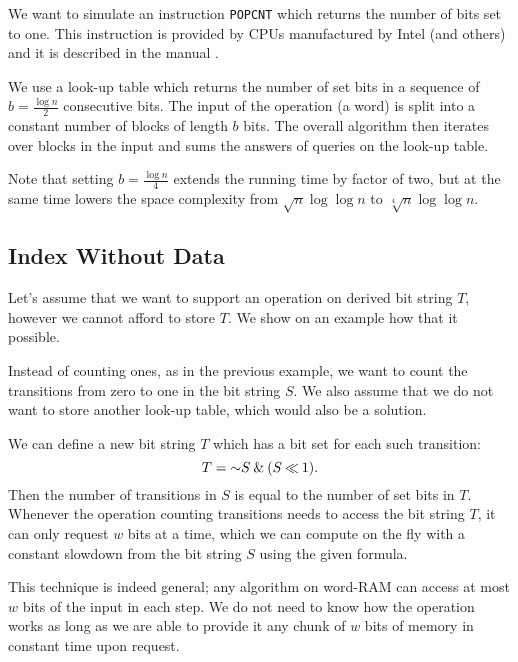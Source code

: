 \begin{example}\label{ex:precomputation}
	We want to simulate an instruction \texttt{POPCNT} which returns the number of bits set to one.
	This instruction is provided by CPUs manufactured by Intel (and others) and it is described in the manual \cite{intelsys}.
	
	We use a look-up table which returns the number of set bits in a sequence of $b = \frac{\log n}{2}$ consecutive bits.
	The input of the operation (a word) is split into a constant number of blocks of length $b$ bits.
	The overall algorithm then iterates over blocks in the input and sums the answers of queries on the look-up table.
	
	Note that setting $b = \frac{\log n}{4}$ extends the running time by factor of two, but at the same time lowers the space complexity from $\sqrt{n}\log \log n$ to $\sqrt[4]{n}\log \log n$.
\end{example}

\subsection{Index Without Data}\label{ss:index-without-data}

Let's assume that we want to support an operation on derived bit string $T$, however we cannot afford to store $T$.
We show on an example how that it possible.

\begin{example}
	Instead of counting ones, as in the previous example, we want to count the transitions from zero to one in the bit string $S$.
	We also assume that we do not want to store another look-up table, which would also be a solution.
	
	We can define a new bit string $T$ which has a bit set for each such transition:
	$$ T = \mathord{\sim} S \mathbin{\&} (S \mathbin{\ll} 1). $$
	Then the number of transitions in $S$ is equal to the number of set bits in $T$.
	Whenever the operation counting transitions needs to access the bit string $T$, it can only request $w$ bits at a time, which we can compute on the fly with a constant slowdown from the bit string $S$ using the given formula.
\end{example}

This technique is indeed general; any algorithm on word-RAM can access at most $w$ bits of the input in each step.
We do not need to know how the operation works as long as we are able to provide it any chunk of $w$ bits of memory in constant time upon request.

